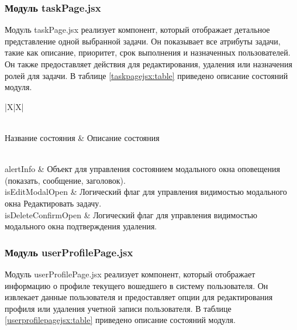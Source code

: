 \subsubsection{Модуль taskPage.jsx}
Модуль taskPage.jsx реализует компонент, который отображает детальное представление одной выбранной задачи. Он показывает все атрибуты задачи, такие как описание, приоритет, срок выполнения и назначенных пользователей. Он также предоставляет действия для редактирования, удаления или назначения ролей для задачи. В таблице \ref{taskpagejsx:table} приведено описание состояний модуля.

\renewcommand{\arraystretch}{0.8}
\begin{xltabular}{\textwidth}{|X|X|}
	\caption{Описание состояний, используемых в taskPage.jsx\label{taskpagejsx:table}}\\
	\hline \centrow \setlength{\baselineskip}{0.7\baselineskip} Название состояния & \centrow \setlength{\baselineskip}{0.7\baselineskip} Описание состояния \\\hline
	\endfirsthead
	\caption*{Продолжение таблицы \ref{taskpagejsx:table}}\\ \hline
	\finishhead
	alertInfo & Объект для управления состоянием модального окна оповещения (показать, сообщение, заголовок). \\ \hline
	isEditModalOpen & Логический флаг для управления видимостью модального окна Редактировать задачу. \\ \hline
	isDeleteConfirmOpen & Логический флаг для управления видимостью модального окна подтверждения удаления. \\ \hline
\end{xltabular}

\subsubsection{Модуль userProfilePage.jsx}
Модуль userProfilePage.jsx реализует компонент, который отображает информацию о профиле текущего вошедшего в систему пользователя. Он извлекает данные пользователя и предоставляет опции для редактирования профиля или удаления учетной записи пользователя. В таблице \ref{userprofilepagejsx:table} приведено описание состояний модуля.

